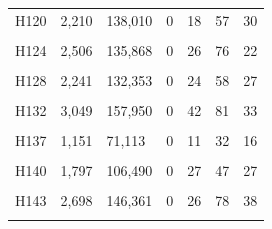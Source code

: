 \documentclass[
  a4paper,
  titlepage]{article}
\begin{document}
\begin{longtable}[t]{lllllll}
H120 & 2,210 & 138,010 & 0 & 18 & 57 & 30\\
 
\cellcolor{gray!6}{H121} & \cellcolor{gray!6}{1,565} & \cellcolor{gray!6}{131,200} & \cellcolor{gray!6}{0} & \cellcolor{gray!6}{19} & \cellcolor{gray!6}{43} & \cellcolor{gray!6}{25}\\
 
H124 & 2,506 & 135,868 & 0 & 26 & 76 & 22\\
 
\cellcolor{gray!6}{H127} & \cellcolor{gray!6}{2,384} & \cellcolor{gray!6}{128,954} & \cellcolor{gray!6}{0} & \cellcolor{gray!6}{31} & \cellcolor{gray!6}{66} & \cellcolor{gray!6}{22}\\
 
H128 & 2,241 & 132,353 & 0 & 24 & 58 & 27\\
 
\cellcolor{gray!6}{H129} & \cellcolor{gray!6}{1,695} & \cellcolor{gray!6}{99,383} & \cellcolor{gray!6}{0} & \cellcolor{gray!6}{17} & \cellcolor{gray!6}{41} & \cellcolor{gray!6}{22}\\
 
H132 & 3,049 & 157,950 & 0 & 42 & 81 & 33\\
 
\cellcolor{gray!6}{H135} & \cellcolor{gray!6}{1,866} & \cellcolor{gray!6}{108,360} & \cellcolor{gray!6}{0} & \cellcolor{gray!6}{25} & \cellcolor{gray!6}{59} & \cellcolor{gray!6}{23}\\
 
H137 & 1,151 & 71,113 & 0 & 11 & 32 & 16\\
 
\cellcolor{gray!6}{H138} & \cellcolor{gray!6}{1,735} & \cellcolor{gray!6}{126,315} & \cellcolor{gray!6}{0} & \cellcolor{gray!6}{18} & \cellcolor{gray!6}{44} & \cellcolor{gray!6}{28}\\
 
H140 & 1,797 & 106,490 & 0 & 27 & 47 & 27\\
 
\cellcolor{gray!6}{H142} & \cellcolor{gray!6}{1,955} & \cellcolor{gray!6}{95,012} & \cellcolor{gray!6}{0} & \cellcolor{gray!6}{21} & \cellcolor{gray!6}{53} & \cellcolor{gray!6}{26}\\
 
H143 & 2,698 & 146,361 & 0 & 26 & 78 & 38\\
 
\cellcolor{gray!6}{H144} & \cellcolor{gray!6}{2,526} & \cellcolor{gray!6}{139,233} & \cellcolor{gray!6}{0} & \cellcolor{gray!6}{37} & \cellcolor{gray!6}{74} & \cellcolor{gray!6}{38}\\
 

\end{longtable}
\end{document}
